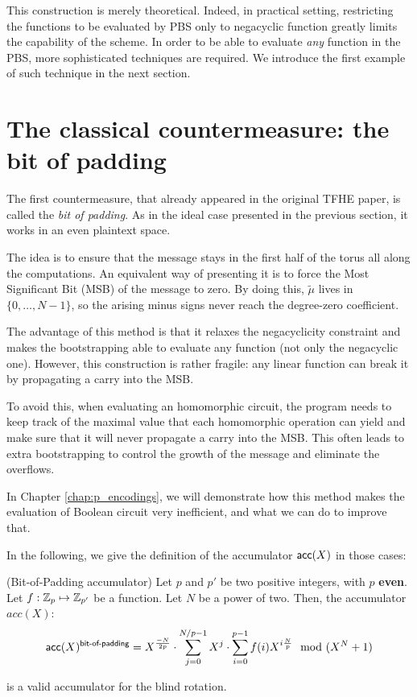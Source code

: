 
This construction is merely theoretical. Indeed, in practical setting, restricting the functions to be evaluated by PBS only to negacyclic function greatly limits the capability of the scheme. In order to be able to evaluate \textit{any} function in the PBS, more sophisticated techniques are required. We introduce the first example of such technique in the next section.


\section{The classical countermeasure: the bit of padding}

The first countermeasure, that already appeared in the original TFHE paper, is called the \textit{bit of padding}. As in the ideal case presented in the previous section, it works in an even plaintext space.

The idea is to ensure that the message stays in the first half of the torus all along the computations. An equivalent way of presenting it is to force the Most Significant Bit (MSB) of the message to zero. By doing this, $\tilde{\mu}$ lives in $\{0, \dots, N - 1\}$, so the arising minus signs never reach the degree-zero coefficient.

The advantage of this method is that it relaxes the negacyclicity constraint and makes the bootstrapping able to evaluate any function (not only the negacyclic one). However, this construction is rather fragile: any linear function can break it by propagating a carry into the MSB. 

To avoid this, when evaluating an homomorphic circuit, the program needs to keep track of the maximal value that each homomorphic operation can yield and make sure that it will never propagate a carry into the MSB. This often leads to extra bootstrapping to control the growth of the message and eliminate the overflows. 

In Chapter \ref{chap:p_encodings}, we will demonstrate how this method makes the evaluation of Boolean circuit very inefficient, and what we can do to improve that.

In the following, we give the definition of the accumulator $\textsf{acc}(X)$ in those cases:

\begin{definition}(Bit-of-Padding accumulator)
	Let $p$ and $p'$ be two positive integers, with $p$ \textbf{even}. Let $f: \mathbb{Z}_p \mapsto \mathbb{Z}_{p'}$ be a function. Let $N$ be a power of two. Then, the accumulator $acc(X)$:
	\[
		\textsf{acc}(X)^{\textsf{bit-of-padding}} = X^{\frac{-N}{2p}} \cdot \sum_{j=0}^{N / p - 1} X^j \cdot \sum_{i=0}^{p - 1} f(i) X^{i \frac{N}{p}} \mod (X^N + 1)
	\]
	
	is a valid accumulator for the blind rotation.
	
\end{definition}

